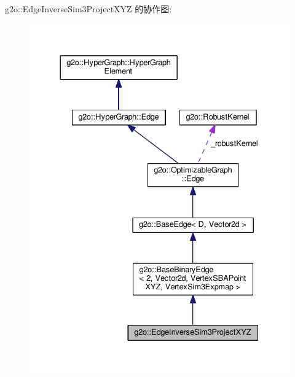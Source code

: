 g2o\-:\-:Edge\-Inverse\-Sim3\-Project\-X\-Y\-Z 的协作图\-:
\nopagebreak
\begin{figure}[H]
\begin{center}
\leavevmode
\includegraphics[width=333pt]{classg2o_1_1EdgeInverseSim3ProjectXYZ__coll__graph}
\end{center}
\end{figure}
